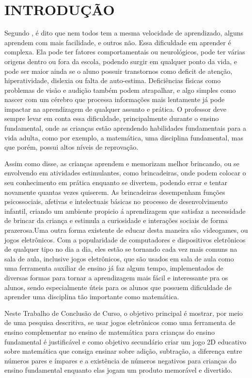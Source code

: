 \chapter{\uppercase{Introdução}}
\label{introducao}


 Segundo , é dito que nem todos tem a mesma velocidade de aprendizado, alguns aprendem com mais facilidade, e outros não. Essa dificuldade em aprender é complexa. Ela pode ter fatores comportamentais ou neurológicos, pode ter várias origens dentro ou fora da escola, podendo surgir em qualquer ponto da vida, e pode ser maior ainda se o aluno possuir transtornos como deficit de atenção, hiperatividade, dislexia ou falta de auto-estima. Deficiências físicas como problemas de visão e audição também podem atrapalhar, e algo simples como nascer com um cérebro que processa informações mais lentamente já pode impactar na aprendizagem de qualquer assunto e prática. O professor deve sempre levar em conta essa dificuldade, principalmente durante o ensino fundamental, onde as crianças estão aprendendo habilidades fundamentais para a vida adulta, como por exemplo, a matemática, uma disciplina fundamental, mas que porém, possui altos níveis de reprovação.

Assim como  disse, as crianças aprendem e memorizam melhor brincando, ou se envolvendo em atividades estimulantes, como brincadeiras, onde podem colocar o seu conhecimento em prática enquanto se divertem, podendo errar e tentar novamente quantas vezes quiserem. As brincadeiras desempenham funções psicossociais, afetivas e intelectuais básicas no processo de desenvolvimento infantil, criando um ambiente propicio á aprendizagem que satisfaz a necessidade de brincar da criança e estimula a curiosidade e interações sociais de forma prazerosa.Uma outra forma existente de educar desta maneira são videogames, ou jogos eletrônicos. Com a popularidade de computadores e dispositivos eletrônicos de qualquer tipo no dia a dia, eles estão se tornando cada vez mais comuns na sala de aula, inclusive jogos eletrônicos, que são usados em sala de aula como uma ferramenta auxiliar de ensino já faz algum tempo, implementados de diversas formas para tornar a aprendizagem mais fácil e interessante pra os alunos, sendo especialmente úteis para os alunos que possuem dificuldade de aprender uma disciplina tão importante como matemática.

Neste Trabalho de Conclusão de Curso, o objetivo principal é mostrar, por meio de uma pesquisa descritiva, se usar jogos eletrônicos como uma ferramenta de ensino complementar no ensino de  matemática para crianças do ensino fundamental é justificável e como objetivo secundário criar um jogo 2D educativo sobre matemática que consiga ensinar sobre adição, subtração, a diferença entre números pares e ímpares e a existência de números negativos para crianças do ensino fundamental enquanto elas jogam um produto memorável e divertido.
